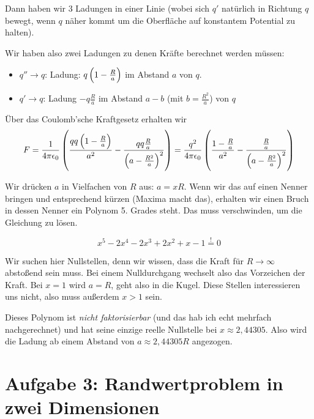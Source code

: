 \documentclass[a4paper,german,12pt,smallheadings]{scrartcl}
\begin{document}
\begin{enumerate}[a)]
  Dann haben wir 3 Ladungen in einer Linie (wobei sich $q'$ natürlich in
  Richtung $q$ bewegt, wenn $q$ näher kommt um die Oberfläche auf konstantem
  Potential zu halten).

  Wir haben also zwei Ladungen zu denen Kräfte berechnet werden müssen:
  \begin{itemize}
    \item $q'' \to q$: Ladung: $q \del{1-\frac{R}{a}}$ im Abstand $a$ von $q$.
    \item $q' \to q$: Ladung $-q\frac{R}{a}$ im Abstand $a - b$ (mit $b =
      \frac{R^2}{a}$) von $q$
  \end{itemize}

  Über das Coulomb'sche Kraftgesetz erhalten wir
  \begin{equation}
    F = \frac{1}{4 \pi \epsilon_0} \del{
      \frac{q q \del{1 - \frac{R}{a}}}{a^2} -
      \frac{q q \frac{R}{a}}{\del{a-\frac{R^2}{a}}^2}
    } = \frac{q^2}{4 \pi \epsilon_0} \del{
      \frac{1 - \frac{R}{a}}{a^2} -
      \frac{\frac{R}{a}}{\del{a-\frac{R^2}{a}}^2}
    }
  \end{equation}

  Wir drücken $a$ in Vielfachen von $R$ aus: $a = x R$. Wenn wir das auf einen
  Nenner bringen und entsprechend kürzen (Maxima macht das), erhalten wir einen
  Bruch in dessen Nenner ein Polynom 5. Grades steht. Das muss verschwinden, um
  die Gleichung zu lösen.

  \begin{equation}
    x^5 - 2x^4 - 2x^3 + 2x^2 + x - 1 \overset{!}{=} 0
  \end{equation}

  Wir suchen hier Nullstellen, denn wir wissen, dass die Kraft für $R \to
  \infty$ abstoßend sein muss.  Bei einem Nulldurchgang wechselt also das
  Vorzeichen der Kraft.
  Bei $x = 1$ wird $a = R$, geht also in die Kugel. Diese Stellen interessieren
  uns nicht, also muss außerdem $x > 1$ sein.

  Dieses Polynom ist \textit{nicht faktorisierbar} (und das hab ich echt
  mehrfach nachgerechnet) und hat seine einzige reelle Nullstelle bei $x
  \approx 2{,}44305$. Also wird die Ladung ab einem Abstand von $a \approx
  2{,}44305 R$ angezogen.
\end{enumerate}

\section*{Aufgabe 3: Randwertproblem in zwei Dimensionen}
\end{document}
